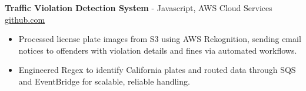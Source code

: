 \documentclass[11pt]{article}       %
\begin{document}

\textbf{Traffic Violation Detection System}{ - Javascript, AWS Cloud Services} \hfill \href{https://github.com/Monica20030707/AWS_rekonigition-N-read-database}{github.com} \\
\vspace{-9pt}
\begin{itemize}
  \item Processed license plate images from S3 using AWS Rekognition, sending email notices to offenders with violation details and fines via automated workflows.
  \item Engineered Regex to identify California plates and routed data through SQS and EventBridge for scalable, reliable handling.
\end{itemize}

\end{document}
